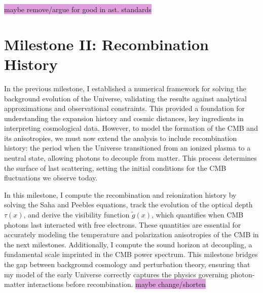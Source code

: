 \documentclass{aa}
\numberwithin{equation}{section}
\numberwithin{table}{section}
\numberwithin{figure}{section}
\begin{document}
\colorbox{Plum}{maybe remove/argue for good in ast. standards}




\section{Milestone II: Recombination History}\label{sec: milestone II}
In the previous milestone, I established a numerical framework for solving the background evolution of the Universe, validating the results against analytical approximations and observational constraints. This provided a foundation for understanding the expansion history and cosmic distances, key ingredients in interpreting cosmological data. However, to model the formation of the CMB and its anisotropies, we must now extend the analysis to include recombination history: the period when the Universe transitioned from an ionized plasma to a neutral state, allowing photons to decouple from matter. This process determines the surface of last scattering, setting the initial conditions for the CMB fluctuations we observe today.  

In this milestone, I compute the recombination and reionization history by solving the Saha and Peebles equations, track the evolution of the optical depth $\tau(x)$, and derive the visibility function $\tilde{g}(x)$, which quantifies when CMB photons last interacted with free electrons. These quantities are essential for accurately modeling the temperature and polarization anisotropies of the CMB in the next milestones. Additionally, I compute the sound horizon at decoupling, a fundamental scale imprinted in the CMB power spectrum. This milestone bridges the gap between background cosmology and perturbation theory, ensuring that my model of the early Universe correctly captures the physics governing photon-matter interactions before recombination. \colorbox{Plum}{maybe change/shorten}
\end{document}
